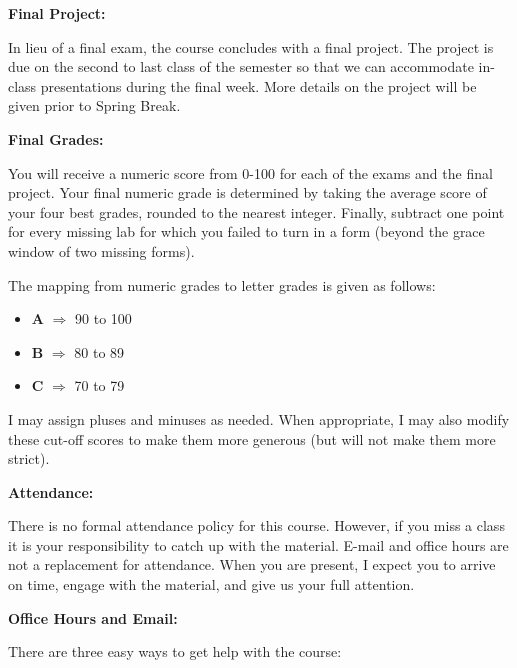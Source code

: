 \documentclass[12pt]{article}
\begin{document}
\vspace{0.4cm}

\textbf{Final Project:} \vspace{6pt}

In lieu of a final exam, the course concludes with a final project.
The project is due on the second to last class of the semester so that we can
accommodate in-class presentations during the final week. More details on the
project will be given prior to Spring Break.

\vspace{0.4cm}

\textbf{Final Grades:} \vspace{6pt}

You will receive a numeric score from 0-100 for each of the exams and the
final project. Your final numeric grade is determined by taking the average
score of your four best grades, rounded to the nearest integer. Finally,
subtract one point for every missing lab for which you failed to turn in a
form (beyond the grace window of two missing forms).

\medskip

The mapping from numeric grades to letter grades is given as follows:
\begin{itemize}\setlength\itemsep{0em}
\item[] \textbf{A} $\Rightarrow$ 90 to 100
\item[] \textbf{B} $\Rightarrow$ 80 to 89
\item[] \textbf{C} $\Rightarrow$ 70 to 79
\end{itemize}
I may assign pluses and minuses as needed. When appropriate, I may also modify
these cut-off scores to make them more generous (but will not make them more
strict).

\vspace{0.4cm}

\textbf{Attendance:} \vspace{6pt}

There is no formal attendance policy for this course. However, if you miss a
class it is your responsibility to catch up with the material. E-mail and
office hours are not a replacement for attendance. When you are present,
I expect you to arrive on time, engage with the material, and give us your
full attention.

\newpage

\textbf{Office Hours and Email:} \vspace{6pt}

There are three easy ways to get help with the course:
\end{document}
